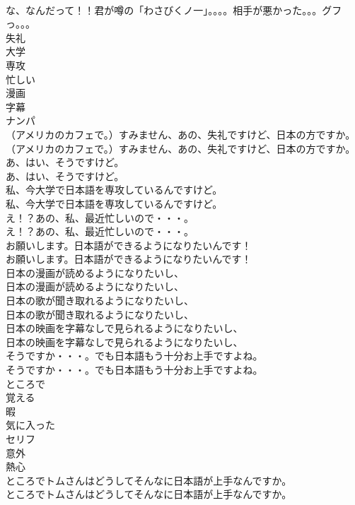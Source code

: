 \documentclass[8pt]{extreport}
\begin{document}
\begin{CJK}{UTF8}{min}
\\	な、なんだって！！君が噂の「わさびくノ一」。。。。相手が悪かった。。。グフっ。。。 
\\	失礼
\\	大学
\\	専攻
\\	忙しい
\\	漫画
\\	字幕
\\	ナンパ
\\	（アメリカのカフェで。）すみません、あの、失礼ですけど、日本の方ですか。	
\\	（アメリカのカフェで。）すみません、あの、失礼ですけど、日本の方ですか。 
\\	あ、はい、そうですけど。	
\\	あ、はい、そうですけど。 
\\	私、今大学で日本語を専攻しているんですけど。	
\\	私、今大学で日本語を専攻しているんですけど。 
\\	え！？あの、私、最近忙しいので・・・。	
\\	え！？あの、私、最近忙しいので・・・。 
\\	お願いします。日本語ができるようになりたいんです！	
\\	お願いします。日本語ができるようになりたいんです！ 
\\	日本の漫画が読めるようになりたいし、	
\\	日本の漫画が読めるようになりたいし、 
\\	日本の歌が聞き取れるようになりたいし、	
\\	日本の歌が聞き取れるようになりたいし、 
\\	日本の映画を字幕なしで見られるようになりたいし、	
\\	日本の映画を字幕なしで見られるようになりたいし、 
\\	そうですか・・・。でも日本語もう十分お上手ですよね。	
\\	そうですか・・・。でも日本語もう十分お上手ですよね。 
\\	ところで
\\	覚える
\\	暇
\\	気に入った
\\	セリフ
\\	意外
\\	熱心
\\	ところでトムさんはどうしてそんなに日本語が上手なんですか。	
\\	ところでトムさんはどうしてそんなに日本語が上手なんですか。 

\end{CJK}
\end{document}
